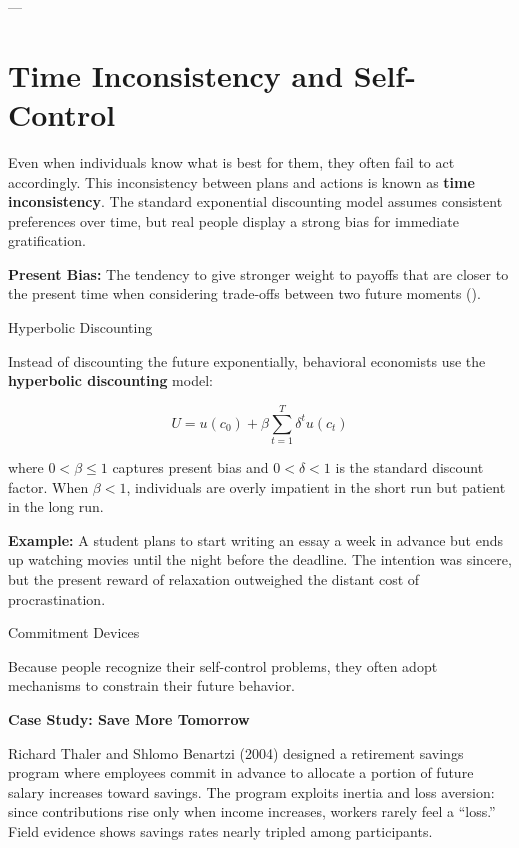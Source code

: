 \documentclass[11pt]{book}
\begin{document}
---

\section*{Time Inconsistency and Self-Control}

Even when individuals know what is best for them, they often fail to act accordingly. This inconsistency between plans and actions is known as \textbf{time inconsistency}. The standard exponential discounting model assumes consistent preferences over time, but real people display a strong bias for immediate gratification.

\begin{definitionbox}
\textbf{Present Bias:} The tendency to give stronger weight to payoffs that are closer to the present time when considering trade-offs between two future moments (\citealp{Laibson1997}).
\end{definitionbox}

Hyperbolic Discounting

Instead of discounting the future exponentially, behavioral economists use the \textbf{hyperbolic discounting} model:

\[
U = u(c_0) + \beta \sum_{t=1}^{T} \delta^t u(c_t)
\]

where \(0 < \beta \le 1\) captures present bias and \(0 < \delta < 1\) is the standard discount factor.  
When \(\beta < 1\), individuals are overly impatient in the short run but patient in the long run.

\begin{examplebox}
\textbf{Example:}  
A student plans to start writing an essay a week in advance but ends up watching movies until the night before the deadline. The intention was sincere, but the present reward of relaxation outweighed the distant cost of procrastination.
\end{examplebox}

Commitment Devices

Because people recognize their self-control problems, they often adopt mechanisms to constrain their future behavior.

\begin{casebox}
\textbf{Case Study: Save More Tomorrow}  

Richard Thaler and Shlomo Benartzi (2004) designed a retirement savings program where employees commit in advance to allocate a portion of future salary increases toward savings.  
The program exploits inertia and loss aversion: since contributions rise only when income increases, workers rarely feel a ``loss.''  
Field evidence shows savings rates nearly tripled among participants.
\end{casebox}
\end{document}
